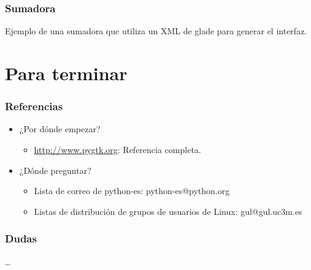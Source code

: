 \documentclass[10pt]{beamer}
\begin{document}
  \begin{frame}[containsverbatim]
    \frametitle{Sumadora}
    Ejemplo de una sumadora que utiliza un XML de glade para generar el interfaz.
  \end{frame}
  
  \section*{Para terminar}
 
  \begin{frame}
    \frametitle{Referencias}
    \begin{itemize}
      \item ¿Por dónde empezar?
        \begin{itemize}
	  \item \url{http://www.pygtk.org}: Referencia completa.
        \end{itemize}
      \item ¿Dónde preguntar?
        \begin{itemize}
	  \item Lista de correo de python-es: python-es@python.org
	  \item Listas de distribución de grupos de usuarios de Linux: gul@gul.uc3m.es
        \end{itemize}
    \end{itemize}
  \end{frame}

  \begin{frame}
    \frametitle{Dudas}
    \dots
  \end{frame}
  
\end{document}
